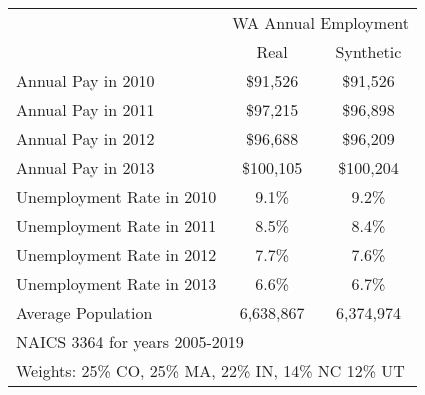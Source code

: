 {
\def\sym#1{\ifmmode^{#1}\else\(^{#1}\)\fi}
\begin{tabular}{l*{1}{cc}}
\hline\hline
            &\multicolumn{2}{c}{WA Annual Employment} \\
            &     Real&         Synthetic\\
\hline
Annual Pay in 2010 &    \$91,526&       \$91,526\\

Annual Pay in 2011 &    \$97,215&       \$96,898\\

Annual Pay in 2012&    \$96,688&       \$96,209\\

Annual Pay in 2013&     \$100,105&     \$100,204\\

Unemployment Rate in 2010&     9.1\%&     9.2\%\\

Unemployment Rate in 2011&     8.5\%&     8.4\%\\

Unemployment Rate in 2012&     7.7\%&     7.6\%\\

Unemployment Rate in 2013&     6.6\%&     6.7\%\\

Average Population& 6,638,867 & 6,374,974 \\

\hline\hline
\multicolumn{3}{l}{\footnotesize NAICS 3364 for years 2005-2019}\\
\multicolumn{3}{l}{\footnotesize Weights: 25\% CO, 25\% MA, 22\% IN, 14\% NC
                    12\% UT}\\
\end{tabular}
}
